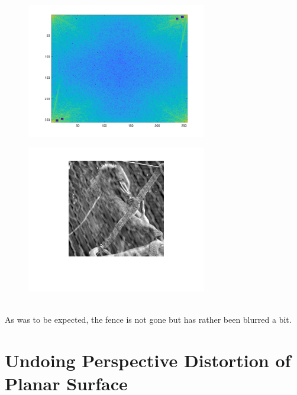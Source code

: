 \documentclass[12pt, a4paper]{article}
\begin{document}
\begin{figure}[H]
    \centering
    \includegraphics[width=0.7\textwidth]{fig30.png}
\end{figure}
\begin{figure}[H]
    \centering
    \includegraphics[width=0.7\textwidth]{fig31.png}
\end{figure}
~\\
As was to be expected, the fence is not gone but has rather been blurred a bit.
\newpage
\section{Undoing Perspective Distortion of Planar Surface}
\end{document}
